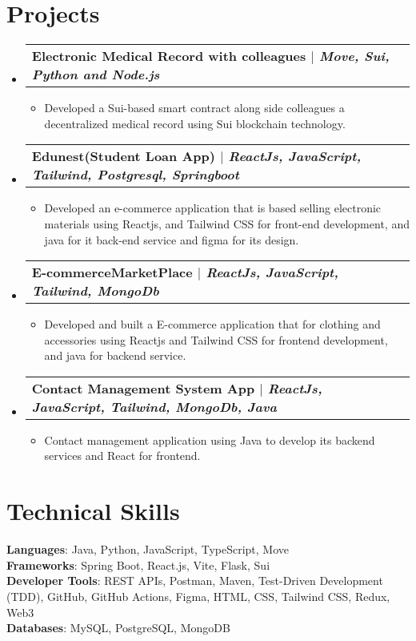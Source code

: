 \documentclass[letterpaper,11pt]{article}
\makeatletter
\newcommand{\resumeItem}[1]{
  \item\small{
    {#1 \vspace{-2pt}}
  }
}
\newcommand{\resumeProjectHeading}[2]{
    \item
    \begin{tabular*}{0.97\textwidth}{l@{\extracolsep{\fill}}r}
      \small#1 & #2 \\
    \end{tabular*}\vspace{-7pt}
}
\newcommand{\resumeSubHeadingListStart}{\begin{itemize}[leftmargin=0.15in, label={}]}
\newcommand{\resumeSubHeadingListEnd}{\end{itemize}}
\newcommand{\resumeItemListStart}{\begin{itemize}}
\newcommand{\resumeItemListEnd}{\end{itemize}\vspace{-5pt}}
\makeatother
\begin{document}
\section{Projects}
    \resumeSubHeadingListStart
      \resumeProjectHeading
          {\textbf{Electronic Medical Record with colleagues $|$ \emph{Move, Sui, Python and Node.js}}}{}
          \resumeItemListStart
            \resumeItem{Developed a Sui-based smart contract along side colleagues a decentralized medical record using Sui blockchain technology.}
          \resumeItemListEnd
      \resumeProjectHeading
          {\textbf{Edunest(Student Loan App) $|$ \emph{ReactJs, JavaScript, Tailwind, Postgresql, Springboot}}}{}
          \resumeItemListStart
            \resumeItem{Developed an e-commerce application that is based selling electronic materials using Reactjs, and Tailwind CSS for front-end development, and java for it back-end service and figma for its design.}
          \resumeItemListEnd
      \resumeProjectHeading
          {\textbf{E-commerceMarketPlace $|$ \emph{ReactJs, JavaScript, Tailwind, MongoDb}}}{}
          \resumeItemListStart
            \resumeItem{Developed and built a E-commerce application that for clothing and accessories using Reactjs and Tailwind CSS for frontend development, and java for backend service.}
          \resumeItemListEnd
      \resumeProjectHeading
          {\textbf{Contact Management System App $|$ \emph{ReactJs, JavaScript, Tailwind, MongoDb, Java}}}{}
          \resumeItemListStart
            \resumeItem{Contact management application using Java to develop its backend services and React for frontend.}
          \resumeItemListEnd
    \resumeSubHeadingListEnd

\section{Technical Skills}
 \begin{itemize}[leftmargin=0.15in, label={}]
    \small{\item{
     \textbf{Languages}: Java, Python, JavaScript, TypeScript, Move \\
     \textbf{Frameworks}: Spring Boot, React.js, Vite, Flask, Sui \\
     \textbf{Developer Tools}: REST APIs, Postman, Maven, Test-Driven Development (TDD), GitHub, GitHub Actions, Figma, HTML, CSS, Tailwind CSS, Redux, Web3 \\
     \textbf{Databases}: MySQL, PostgreSQL, MongoDB
    }}
 \end{itemize}

\end{document}
